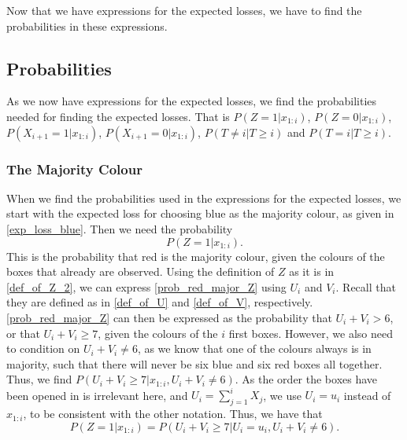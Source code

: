 Now that we have expressions for the expected losses, we have to find the probabilities in these expressions. 

\subsection{Probabilities}
As we now have expressions for the expected losses, we find the probabilities needed for finding the expected losses. That is $P(Z=1|x_{1:i})$, $P(Z=0|x_{1:i})$, $P(X_{i+1}=1|x_{1:i})$, $P(X_{i+1}=0|x_{1:i})$, $P(T\neq i|T\geq i)$ and $P(T=i|T\geq i)$.

\subsubsection{The Majority Colour}
When we find the probabilities used in the expressions for the expected losses, we start with the expected loss for choosing blue as the majority colour, as given in \eqref{exp_loss_blue}. Then we need the probability
\begin{equation}
\label{prob_red_major_Z}
    P(Z=1|x_{1:i}).
\end{equation}
This is the probability that red is the majority colour, given the colours of the boxes that already are observed. Using the definition of $Z$ as it is in \eqref{def_of_Z_2}, we can express \eqref{prob_red_major_Z} using $U_i$ and $V_i$. Recall that they are defined as in \eqref{def_of_U} and \eqref{def_of_V}, respectively. \eqref{prob_red_major_Z} can then be expressed as the probability that $U_i+V_i>6$, or that $U_i+V_i \geq 7$, given the colours of the $i$ first boxes. However, we also need to condition on $U_i+V_i \neq 6$, as we know that one of the colours always is in majority, such that there will never be six blue and six red boxes all together. Thus, we find $P(U_i+V_i \geq 7 | x_{1:i},U_i+V_i \neq 6)$. As the order the boxes have been opened in is irrelevant here, and $U_i = \sum_{j=1}^i X_j$, we use $U_i=u_i$ instead of $x_{1:i}$, to be consistent with the other notation. Thus, we have that
\begin{equation}
\label{Z_to_U_and_V}
    P(Z=1|x_{1:i}) = P(U_i+V_i \geq 7 | U_i=u_i,U_i+V_i \neq 6).
\end{equation}

